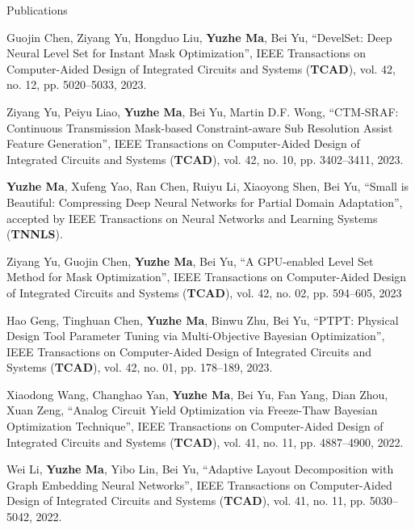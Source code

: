 \begin{rSection}{Publications}
\begin{etaremune}
\item {
    Guojin Chen, Ziyang Yu, Hongduo Liu, \textbf{Yuzhe Ma}, Bei Yu, 
    ``DevelSet: Deep Neural Level Set for Instant Mask Optimization'',
    IEEE Transactions on Computer-Aided Design of Integrated Circuits and Systems (\textbf{TCAD}), vol. 42, no. 12, pp. 5020--5033, 2023.
}

\item {
    Ziyang Yu, Peiyu Liao, \textbf{Yuzhe Ma}, Bei Yu, Martin D.F. Wong, 
    ``CTM-SRAF: Continuous Transmission Mask-based Constraint-aware Sub Resolution Assist Feature Generation'',
    IEEE Transactions on Computer-Aided Design of Integrated Circuits and Systems (\textbf{TCAD}), vol. 42, no. 10, pp. 3402--3411, 2023. 
}

\item {
    \textbf{Yuzhe Ma}, Xufeng Yao, Ran Chen, Ruiyu Li, Xiaoyong Shen, Bei Yu, 
    ``Small is Beautiful: Compressing Deep Neural Networks for Partial Domain Adaptation'',
    accepted by IEEE Transactions on Neural Networks and Learning Systems (\textbf{TNNLS}).
}

\item {
    Ziyang Yu, Guojin Chen, \textbf{Yuzhe Ma}, Bei Yu, 
    ``A GPU-enabled Level Set Method for Mask Optimization'',
    IEEE Transactions on Computer-Aided Design of Integrated Circuits and Systems (\textbf{TCAD}), vol. 42, no. 02, pp. 594--605, 2023
}

\item {
    Hao Geng, Tinghuan Chen, \textbf{Yuzhe Ma}, Binwu Zhu, Bei Yu, 
    ``PTPT: Physical Design Tool Parameter Tuning via Multi-Objective Bayesian Optimization'',
    IEEE Transactions on Computer-Aided Design of Integrated Circuits and Systems (\textbf{TCAD}), vol. 42, no. 01, pp. 178--189, 2023.
}

\item {
    Xiaodong Wang, Changhao Yan, \textbf{Yuzhe Ma}, Bei Yu, Fan Yang, Dian Zhou, Xuan Zeng, 
    ``Analog Circuit Yield Optimization via Freeze-Thaw Bayesian Optimization Technique'',
    IEEE Transactions on Computer-Aided Design of Integrated Circuits and Systems (\textbf{TCAD}), vol. 41, no. 11, pp. 4887--4900, 2022.
}

\item {
    Wei Li, \textbf{Yuzhe Ma}, Yibo Lin, Bei Yu,
    ``Adaptive Layout Decomposition with Graph Embedding Neural Networks'',
    IEEE Transactions on Computer-Aided Design of Integrated Circuits and Systems (\textbf{TCAD}), vol. 41, no. 11, pp. 5030--5042, 2022.
}


\end{etaremune}
\end{rSection}
